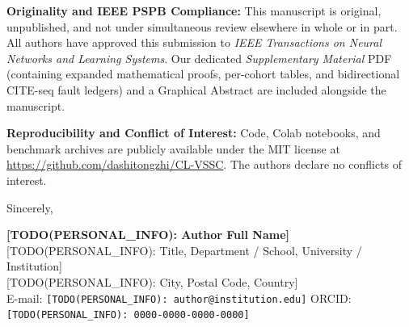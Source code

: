 \documentclass[11pt,letterpaper]{article}
\begin{document}
\textbf{Originality and IEEE PSPB Compliance:}
This manuscript is original, unpublished, and not under simultaneous review elsewhere in whole or in part. All authors have approved this submission to \textit{IEEE Transactions on Neural Networks and Learning Systems}. Our dedicated \textit{Supplementary Material} PDF (containing expanded mathematical proofs, per-cohort tables, and bidirectional CITE-seq fault ledgers) and a Graphical Abstract are included alongside the manuscript.

\textbf{Reproducibility and Conflict of Interest:}
Code, Colab notebooks, and benchmark archives are publicly available under the MIT license at \url{https://github.com/dashitongzhi/CL-VSSC}. The authors declare no conflicts of interest.

\vspace{6pt}
Sincerely,

\textbf{[TODO(PERSONAL\_INFO): Author Full Name]}\\
{[TODO(PERSONAL\_INFO): Title, Department / School, University / Institution]}\\
{[TODO(PERSONAL\_INFO): City, Postal Code, Country]}\\
E-mail: \texttt{[TODO(PERSONAL\_INFO): author@institution.edu]} \quad ORCID: \texttt{[TODO(PERSONAL\_INFO): 0000-0000-0000-0000]}
\end{document}
